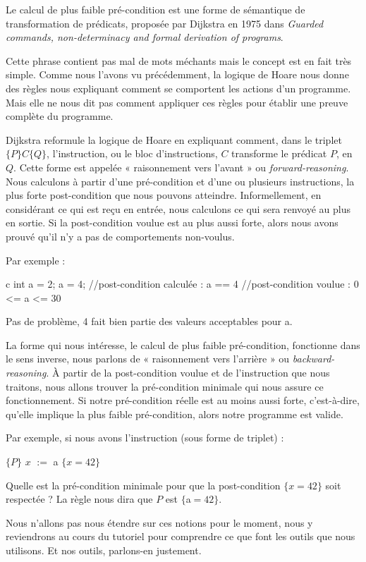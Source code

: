 

Le calcul de plus faible pré-condition est une forme de sémantique de 
transformation de prédicats, proposée par Dijkstra en 1975 dans \textit{Guarded 
commands, non-determinacy and formal derivation of programs}.



Cette phrase contient pas mal de mots méchants mais le concept est en fait très
simple. Comme nous l'avons vu précédemment, la logique de Hoare nous donne des
règles nous expliquant comment se comportent les actions d'un programme. Mais 
elle ne nous dit pas comment appliquer ces règles pour établir une preuve 
complète du programme.



Dijkstra reformule la logique de Hoare en expliquant comment, dans le triplet 
$\{P\}C\{Q\}$, l'instruction, ou le bloc d'instructions, $C$ transforme le 
prédicat $P$, en $Q$. Cette forme est appelée « raisonnement vers l'avant » ou 
\textit{forward-reasoning}. Nous calculons à partir d'une pré-condition et d'une ou 
plusieurs instructions, la plus forte post-condition que nous pouvons
atteindre. Informellement, en considérant ce qui est reçu en entrée, nous 
calculons ce qui sera renvoyé au plus en sortie. Si la post-condition voulue
est au plus aussi forte, alors nous avons prouvé qu'il n'y a pas de 
comportements non-voulus.



Par exemple :

\begin{CodeBlock}{c}
int a = 2;
a = 4;
//post-condition calculée : a == 4
//post-condition voulue   : 0 <= a <= 30
\end{CodeBlock}



Pas de problème, 4 fait bien partie des valeurs acceptables pour a.



La forme qui nous intéresse, le calcul de plus faible pré-condition, fonctionne
dans le sens inverse, nous parlons de « raisonnement vers l'arrière » ou 
\textit{backward-reasoning}. À partir de la post-condition voulue et de 
l'instruction que nous traitons, nous allons trouver la pré-condition minimale
qui nous assure ce fonctionnement. Si notre pré-condition réelle est au moins
aussi forte, c'est-à-dire, qu'elle implique la plus faible pré-condition, alors
notre programme est valide.



Par exemple, si nous avons l'instruction (sous forme de triplet) :



$\{P\}$ $x$ $:=$ a $\{x = 42\}$



Quelle est la pré-condition minimale pour que la post-condition $\{x = 42\}$ 
soit respectée ? La règle nous dira que $P$ est $\{$a$=42\}$.



Nous n'allons pas nous étendre sur ces notions pour le moment, nous y 
reviendrons au cours du tutoriel pour comprendre ce que font les outils que
nous utilisons. Et nos outils, parlons-en justement.
